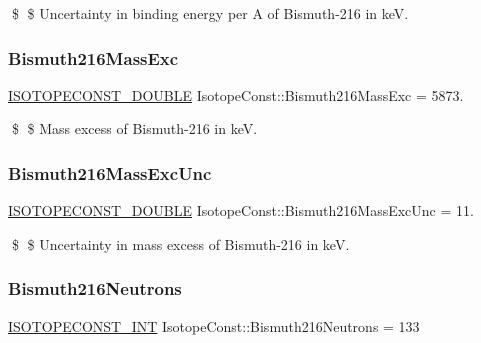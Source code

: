 \$ \$ Uncertainty in binding energy per A of Bismuth-\/216 in keV. \mbox{\label{group___isotope_const-_bismuth-_bi216_gaece2504face1daeed56f19d32ebba6fe}} 
\subsubsection{\texorpdfstring{Bismuth216\+Mass\+Exc}{Bismuth216MassExc}}
{\footnotesize\ttfamily \mbox{\hyperlink{group___isotope_const-_macros_ga8f45a7272ce02c0b4c65c44636ed719a}{I\+S\+O\+T\+O\+P\+E\+C\+O\+N\+S\+T\+\_\+\+D\+O\+U\+B\+LE}} Isotope\+Const\+::\+Bismuth216\+Mass\+Exc = 5873.}

\$ \$ Mass excess of Bismuth-\/216 in keV. \mbox{\label{group___isotope_const-_bismuth-_bi216_gaadf3854760f7231c46fa422815407716}} 
\subsubsection{\texorpdfstring{Bismuth216\+Mass\+Exc\+Unc}{Bismuth216MassExcUnc}}
{\footnotesize\ttfamily \mbox{\hyperlink{group___isotope_const-_macros_ga8f45a7272ce02c0b4c65c44636ed719a}{I\+S\+O\+T\+O\+P\+E\+C\+O\+N\+S\+T\+\_\+\+D\+O\+U\+B\+LE}} Isotope\+Const\+::\+Bismuth216\+Mass\+Exc\+Unc = 11.}

\$ \$ Uncertainty in mass excess of Bismuth-\/216 in keV. \mbox{\label{group___isotope_const-_bismuth-_bi216_ga498f15c14bc8608ff9688eef8747a82c}} 
\subsubsection{\texorpdfstring{Bismuth216\+Neutrons}{Bismuth216Neutrons}}
{\footnotesize\ttfamily \mbox{\hyperlink{group___isotope_const-_macros_ga5f18360b3e99483a35c32d789e62621c}{I\+S\+O\+T\+O\+P\+E\+C\+O\+N\+S\+T\+\_\+\+I\+NT}} Isotope\+Const\+::\+Bismuth216\+Neutrons = 133}

